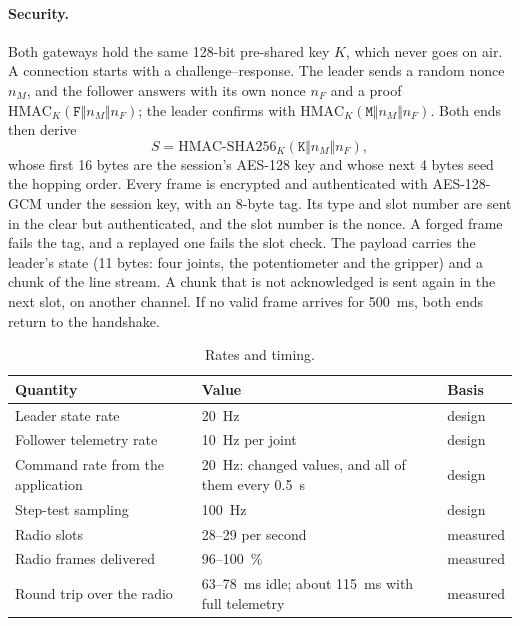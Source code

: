 \documentclass[11pt,a4paper]{article}
\begin{document}
\paragraph{Security.} Both gateways hold the same 128-bit pre-shared key $K$, which never goes on air. A
connection starts with a challenge--response. The leader sends a random nonce $n_M$, and the follower answers
with its own nonce $n_F$ and a proof $\mathrm{HMAC}_K(\texttt{F}\Vert n_M\Vert n_F)$; the leader confirms with
$\mathrm{HMAC}_K(\texttt{M}\Vert n_M\Vert n_F)$. Both ends then derive
\begin{equation}
  S=\mathrm{HMAC\text{-}SHA256}_K(\texttt{K}\Vert n_M\Vert n_F),
\end{equation}
whose first 16 bytes are the session's AES-128 key and whose next 4 bytes seed the hopping order. Every frame
is encrypted and authenticated with AES-128-GCM under the session key, with an 8-byte tag. Its type and slot
number are sent in the clear but authenticated, and the slot number is the nonce. A forged frame fails the tag,
and a replayed one fails the slot check. The payload carries the leader's state (11 bytes: four joints, the
potentiometer and the gripper) and a chunk of the line stream. A chunk that is not acknowledged is sent again
in the next slot, on another channel. If no valid frame arrives for \SI{500}{\milli\second}, both ends return
to the handshake.

\begin{table}[ht]
\centering\small
\begin{tabularx}{\linewidth}{@{}lLl@{}}
\toprule
Quantity & Value & Basis \\
\midrule
Leader state rate & \SI{20}{\hertz} & design \\
Follower telemetry rate & \SI{10}{\hertz} per joint & design \\
Command rate from the application & \SI{20}{\hertz}: changed values, and all of them every \SI{0.5}{\second}
  & design \\
Step-test sampling & \SI{100}{\hertz} & design \\
Radio slots & 28--29 per second & measured \\
Radio frames delivered & 96--\SI{100}{\percent} & measured \\
Round trip over the radio & 63--\SI{78}{\milli\second} idle; about \SI{115}{\milli\second} with full telemetry
  & measured \\
\bottomrule
\end{tabularx}
\caption{Rates and timing.}
\label{tab:timing}
\end{table}
\end{document}
